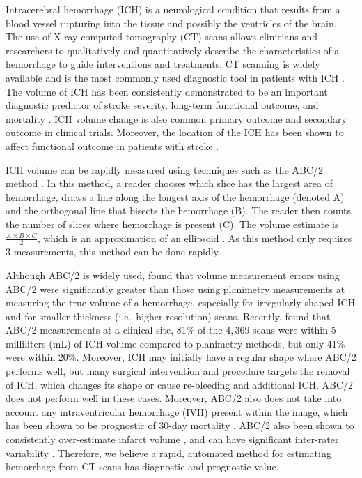 \documentclass{elsarticle_nonatbib}\usepackage[]{graphicx}\usepackage[]{color}
\begin{document}
Intracerebral hemorrhage (ICH) is a neurological condition that results from a blood vessel rupturing into the tissue and possibly the ventricles of the brain.   The use of X-ray computed tomography (CT) scans allows clinicians and researchers to qualitatively and quantitatively describe the characteristics of a hemorrhage to guide interventions and treatments.  CT scanning is widely available and is the most commonly used diagnostic tool in patients with ICH \citep{sahni_management_2007}.  The volume of ICH has been consistently demonstrated to be an important diagnostic predictor of stroke severity, long-term functional outcome, and mortality \citep{broderick_volume_1993, hemphill_ich_2001, tuhrim_volume_1999}.  ICH volume change is also common primary outcome \citep{anderson_intensive_2008, anderson_effects_2010, qureshi_association_2011, mayer_recombinant_2005} and secondary outcome \citep{morgan_preliminary_2008_mistie, anderson_intensive_2008, morgan_preliminary_2008_clear} in clinical trials.  Moreover, the location of the ICH has been shown to affect functional outcome in patients with stroke \citep{rost_prediction_2008, castellanos_predictors_2005}.

ICH volume can be rapidly measured using techniques such as the ABC/2 method \citep{broderick_volume_1993}.  In this method, a reader chooses which slice has the largest area of hemorrhage, draws a line along the longest axis of the hemorrhage (denoted A) and the orthogonal line that bisects the hemorrhage (B).  The reader then counts the number of slices where hemorrhage is present (C).  The volume estimate is $\frac{A\times B\times C}{2}$, which is an approximation of an ellipsoid \citep{kothari_abcs_1996}.  As this method only requires 3 measurements, this method can be done rapidly. 

Although ABC/2 is widely used, \citet{divani_abcs_2011} found that volume measurement errors using ABC/2 were significantly greater than those using planimetry measurements at measuring the true volume of a hemorrhage, especially for irregularly shaped ICH and for smaller thickness (i.e.~higher resolution) scans.  Recently, \citet{webb_accuracy_2015} found that ABC/2 measurements at a clinical site, 81\% of the $4,369$ scans were within 5 milliliters (mL) of ICH volume compared to planimetry methods, but only 41\% were within 20\%.   Moreover, ICH may initially have a regular shape where ABC/2 performs well, but many surgical intervention and procedure targets the removal of ICH, which changes its shape or cause re-bleeding and additional ICH.  ABC/2 does not perform well in these cases.  Moreover, ABC/2 also does not take into account any intraventricular hemorrhage (IVH) present within the image, which has been shown to be prognostic of 30-day mortality \citep{hemphill_ich_2001, tuhrim_volume_1999}.  ABC/2 also been shown to consistently over-estimate infarct volume \citep{pedraza_reliability_2012}, and can have significant inter-rater variability \citep{hussein_reliability_2013}. Therefore, we believe a rapid, automated method for estimating hemorrhage from CT scans has diagnostic and prognostic value.
\end{document}

